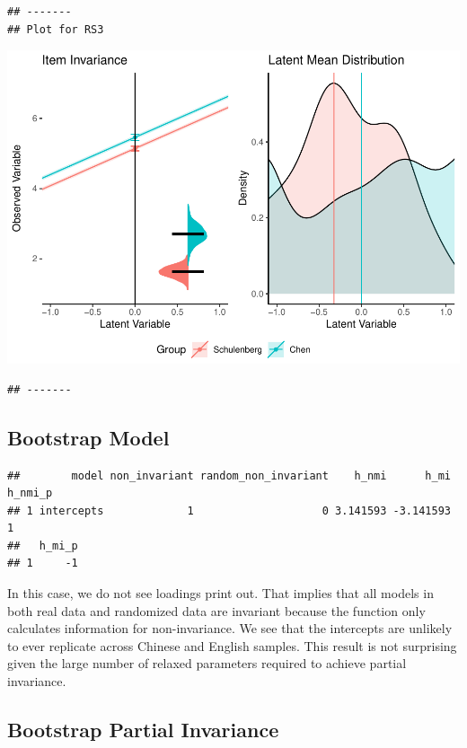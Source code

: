\documentclass[
  man]{apa7}
\begin{document}
\begin{verbatim}
## -------
## Plot for RS3
\end{verbatim}

\includegraphics{manuscript_files/figure-latex/unnamed-chunk-103-8.pdf}

\begin{verbatim}
## -------
\end{verbatim}

\hypertarget{bootstrap-model}{%
\subsection{Bootstrap Model}\label{bootstrap-model}}

\begin{verbatim}
##        model non_invariant random_non_invariant    h_nmi      h_mi h_nmi_p
## 1 intercepts             1                    0 3.141593 -3.141593       1
##   h_mi_p
## 1     -1
\end{verbatim}

In this case, we do not see loadings print out. That implies that all models in both real data and randomized data are invariant because the function only calculates information for non-invariance. We see that the intercepts are unlikely to ever replicate across Chinese and English samples. This result is not surprising given the large number of relaxed parameters required to achieve partial invariance.

\hypertarget{bootstrap-partial-invariance}{%
\subsection{Bootstrap Partial Invariance}\label{bootstrap-partial-invariance}}
\end{document}
